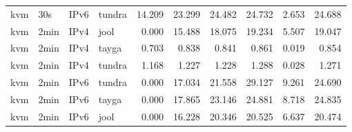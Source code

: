 \begin{table}[htbp]
\begin{tabular}{|l|l|l|l|r|r|r|r|r|r|}
kvm & 30s & IPv6 & tundra & 14.209 & 23.299 & 24.482 & 24.732 & 2.653 & 24.688 \\
kvm & 2min & IPv4 & jool & 0.000 & 15.488 & 18.075 & 19.234 & 5.507 & 19.047 \\
kvm & 2min & IPv4 & tayga & 0.703 & 0.838 & 0.841 & 0.861 & 0.019 & 0.854 \\
kvm & 2min & IPv4 & tundra & 1.168 & 1.227 & 1.228 & 1.288 & 0.028 & 1.271 \\
kvm & 2min & IPv6 & tundra & 0.000 & 17.034 & 21.558 & 29.127 & 9.261 & 24.690 \\
kvm & 2min & IPv6 & tayga & 0.000 & 17.865 & 23.146 & 24.881 & 8.718 & 24.835 \\
kvm & 2min & IPv6 & jool & 0.000 & 16.228 & 20.346 & 20.525 & 6.637 & 20.474 \\
\hline
\end{tabular}
\end{table}


